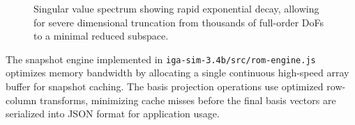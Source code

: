 \begin{figure}[H]
    \centering
    \vspace{4cm}
    \caption{Singular value spectrum showing rapid exponential decay, allowing for severe dimensional truncation from thousands of full-order DoFs to a minimal reduced subspace.}
    \label{fig:svd_decay}
\end{figure}

\begin{devnote}
The snapshot engine implemented in \texttt{iga-sim-3.4b/src/rom-engine.js} optimizes memory bandwidth by allocating a single continuous high-speed array buffer for snapshot caching. The basis projection operations use optimized row-column transforms, minimizing cache misses before the final basis vectors are serialized into JSON format for application usage.
\end{devnote}